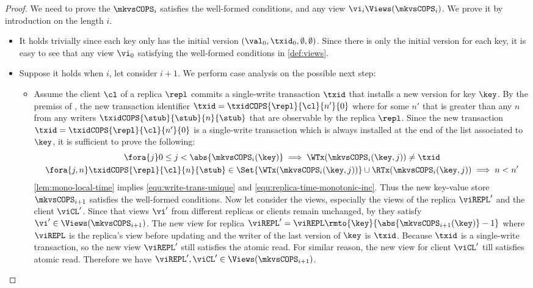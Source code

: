 \begin{proof}
    We need to prove the  \( \mkvsCOPS_i \) satisfies the well-formed conditions,
    and any view \( \vi_i \Views(\mkvsCOPS_i) \).
    We prove it by introduction on the length \( i \).
    \begin{itemize}
    \item {}
        It holds trivially since each key only has the initial version \( (\val_0,\txid_0,\emptyset, \emptyset) \).
        Since there is only the initial version for each key, it is easy to see that any view \( \vi_0 \) satisfying the well-formed conditions in \cref{def:views}.
    \item {}
        Suppose it holds when \( i \), let consider \( i + 1 \).
        We perform case analysis on the possible next step:
        \begin{itemize}
            \item {}
                Assume the client \( \cl \) of a replica \( \repl \) commits a single-write transaction \( \txid \) that installs a new version for key \( \key \).
                By the premiss of , the new transaction identifier \( \txid = \txidCOPS{\repl}{\cl}{n'}{0} \) where for some \( n' \) that is greater than any \( n \) from any writers \( \txidCOPS{\stub}{\stub}{n}{\stub} \) that are observable by the replica \( \repl \).
                Since the new transaction \( \txid = \txidCOPS{\repl}{\cl}{n'}{0} \) is a single-write transaction which is always installed at the end of the list associated to \( \key \), it is sufficient to prove the following:
                \begin{gather}
                    \fora{j} 0 \leq j < \abs{ \mkvsCOPS_i(\key) } \implies \WTx(\mkvsCOPS_{i}(\key, j)) \neq \txid \label{equ:write-trans-unique} \\
                    \fora{j, n} \txidCOPS{\repl}{\cl}{n}{\stub} \in \Set{\WTx(\mkvsCOPS_{i}(\key,j))} \cup \RTx(\mkvsCOPS_{i}(\key, j)) \implies n < n' \label{equ:replica-time-monotonic-inc}
                \end{gather}
                \cref{lem:mono-local-time} implies \cref{equ:write-trans-unique} and \cref{equ:replica-time-monotonic-inc}.
                Thus the new key-value store \( \mkvsCOPS_{i+1} \) satisfies the well-formed conditions.
                Now let consider the views, especially the views of the replica \( \viREPL' \) and the client \( \viCL' \).
                Since that views \( \vi' \) from different replicas or clients remain unchanged, by \ih they satisfy \( \vi' \in \Views(\mkvsCOPS_{i+1}) \).
                The new view for replica \( \viREPL' = \viREPL\rmto{\key}{\abs{\mkvsCOPS_{i+1}(\key)} - 1} \)
                where \( \viREPL \) is the replica's view before updating and the writer of the last version of \( \key \) is \( \txid \).
                Because \( \txid \) is a single-write transaction, so the new view \( \viREPL' \) still satisfies the atomic read.
                For similar reason, the new view for client \( \viCL' \) till satisfies atomic read.
                Therefore we have \( \viREPL', \viCL' \in \Views(\mkvsCOPS_{i+1}) \).


\end{itemize}
\end{itemize}
\end{proof}
